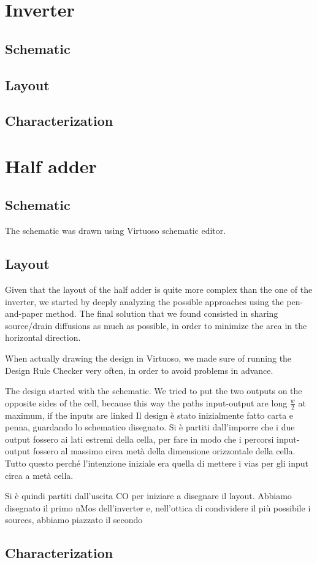 \documentclass[a4paper]{article}
\begin{document}
\section{Inverter}
\subsection{Schematic}


\subsection{Layout}
\subsection{Characterization}

\section{Half adder}
\subsection{Schematic}
The schematic was drawn using Virtuoso schematic editor.

\subsection{Layout}
Given that the layout of the half adder is quite more complex than the one of the inverter, we started by deeply analyzing the possible approaches using the pen-and-paper method. The final solution that we found consisted in sharing source/drain diffusions as much as possible, in order to minimize the area in the horizontal direction.

When actually drawing the design in Virtuoso, we made sure of running the Design Rule Checker very often, in order to avoid problems in advance.

The design started with the schematic. We tried to put the two outputs on the opposite sides of the cell, because this way the paths input-output are long $\frac{w}{2}$ at maximum, if the inputs are linked
Il design è stato inizialmente fatto carta e penna, guardando lo schematico disegnato. Si è partiti dall'imporre che i due output fossero ai lati estremi della cella, per fare in modo che i percorsi input-output fossero al massimo circa metà della dimensione orizzontale della cella. Tutto questo perché l'intenzione iniziale era quella di mettere i vias per gli input circa a metà cella.

Si è quindi partiti dall'uscita CO per iniziare a disegnare il layout. Abbiamo disegnato il primo nMos dell'inverter e, nell'ottica di condividere il più possibile i sources, abbiamo piazzato il secondo


\subsection{Characterization}
\end{document}
